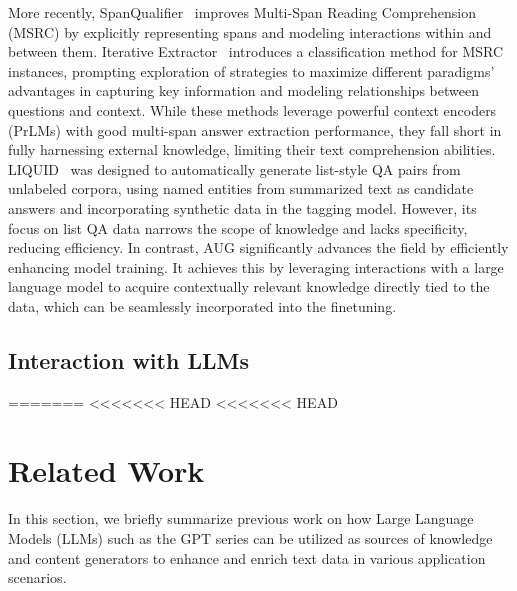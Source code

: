 More recently, SpanQualifier~\cite{huang2023qualifier} improves Multi-Span Reading Comprehension (MSRC) by explicitly representing spans and modeling interactions within and between them.
Iterative Extractor~\cite{zhang2023many} introduces a classification method for MSRC instances, prompting exploration of strategies to maximize different paradigms' advantages in capturing key information and modeling relationships between questions and context.
While these methods leverage powerful context encoders (PrLMs) with good multi-span answer extraction performance, they fall short in fully harnessing external knowledge, limiting their text comprehension abilities.
LIQUID~\cite{lee2023liquid} was designed to automatically generate list-style QA pairs from unlabeled corpora, using named entities from summarized text as candidate answers and incorporating synthetic data in the tagging model. However, its focus on list QA data narrows the scope of knowledge and lacks specificity, reducing efficiency.
In contrast, AUG significantly advances the field by efficiently enhancing model training. It achieves this by leveraging interactions with a large language model to acquire contextually relevant knowledge directly tied to the data, which can be seamlessly incorporated into the finetuning.


\subsection{Interaction with LLMs}
=======
<<<<<<< HEAD
<<<<<<< HEAD

\section{Related Work}
\label{sec:related}
In this section, we briefly summarize previous work on how Large Language Models (LLMs) such as the GPT series can be utilized as sources of knowledge and content generators to enhance and enrich text data in various application scenarios.

